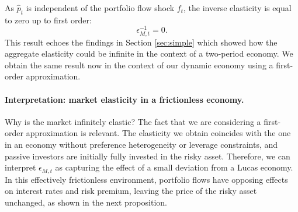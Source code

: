 As $\hat{p}_t$ is independent of the portfolio flow shock $f_t$, the inverse elasticity is equal to zero up to first order:
\begin{equation}
    \epsilon_{M,t}^{-1} = 0.
\end{equation}
This result echoes the findings in Section \ref{sec:simple} which showed how the aggregate elasticity could be infinite in the context of a two-period economy. We obtain the same result now in the context of our dynamic economy using a first-order approximation.


\paragraph{Interpretation: market elasticity in a frictionless economy.} Why is the market infinitely elastic? The fact that we are considering a first-order approximation is relevant. 
The elasticity we obtain coincides with the one in an economy without preference heterogeneity or leverage constraints, and passive investors are initially fully invested in the risky asset. 
Therefore, we can interpret $\epsilon_{M,t}$ as capturing the effect of a small deviation from a Lucas economy. 
In this effectively frictionless environment, portfolio flows have opposing effects on interest rates and risk premium, leaving the price of the risky asset unchanged, as shown in the next proposition.

